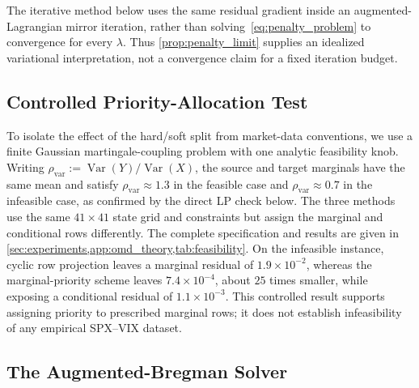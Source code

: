 \documentclass{article}
\begin{document}
The iterative method below uses the same residual gradient inside an augmented-Lagrangian mirror iteration, rather than solving~\eqref{eq:penalty_problem} to convergence for every $\lambda$.
Thus \cref{prop:penalty_limit} supplies an idealized variational interpretation, not a convergence claim for a fixed iteration budget.

\subsection{Controlled Priority-Allocation Test}\label{subsec:priority_test}

To isolate the effect of the hard/soft split from market-data conventions, we use a finite Gaussian martingale-coupling problem with one analytic feasibility knob.
Writing $\rho_{\mathrm{var}}:=\operatorname{Var}(Y)/\operatorname{Var}(X)$, the source and target marginals have the same mean and satisfy $\rho_{\mathrm{var}}\approx1.3$ in the feasible case and $\rho_{\mathrm{var}}\approx0.7$ in the infeasible case, as confirmed by the direct LP check below.
The three methods use the same $41\times41$ state grid and constraints but assign the marginal and conditional rows differently.
The complete specification and results are given in \cref{sec:experiments,app:omd_theory,tab:feasibility}.
On the infeasible instance, cyclic row projection leaves a marginal residual of $1.9\times10^{-2}$, whereas the marginal-priority scheme leaves $7.4\times10^{-4}$, about $25$ times smaller, while exposing a conditional residual of $1.1\times10^{-3}$.
This controlled result supports assigning priority to prescribed marginal rows; it does not establish infeasibility of any empirical SPX--VIX dataset.

\subsection{The Augmented-Bregman Solver}\label{subsec:augmented}
\end{document}
